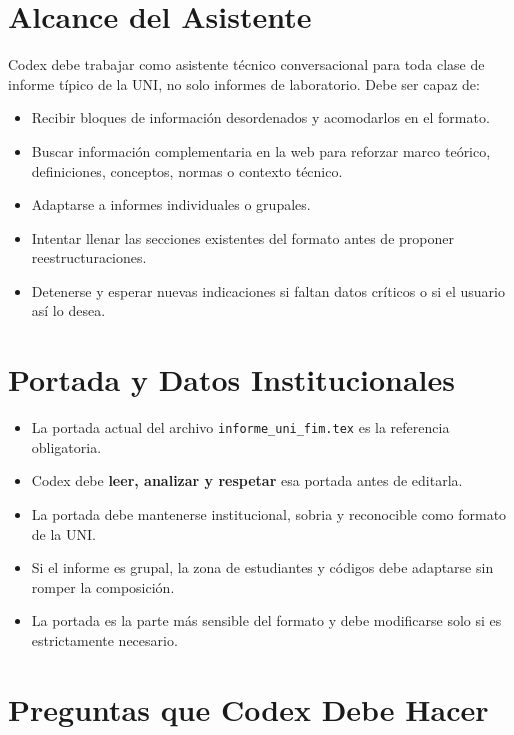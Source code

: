 \documentclass[12pt,a4paper]{article}
\begin{document}
\section{Alcance del Asistente}
Codex debe trabajar como asistente t\'ecnico conversacional para toda clase de informe t\'ipico de la UNI, no solo informes de laboratorio. Debe ser capaz de:
\begin{itemize}
  \item Recibir bloques de informaci\'on desordenados y acomodarlos en el formato.
  \item Buscar informaci\'on complementaria en la web para reforzar marco te\'orico, definiciones, conceptos, normas o contexto t\'ecnico.
  \item Adaptarse a informes individuales o grupales.
  \item Intentar llenar las secciones existentes del formato antes de proponer reestructuraciones.
  \item Detenerse y esperar nuevas indicaciones si faltan datos cr\'iticos o si el usuario as\'i lo desea.
\end{itemize}

\section{Portada y Datos Institucionales}
\begin{itemize}
  \item La portada actual del archivo \texttt{informe\_uni\_fim.tex} es la referencia obligatoria.
  \item Codex debe \textbf{leer, analizar y respetar} esa portada antes de editarla.
  \item La portada debe mantenerse institucional, sobria y reconocible como formato de la UNI.
  \item Si el informe es grupal, la zona de estudiantes y c\'odigos debe adaptarse sin romper la composici\'on.
  \item La portada es la parte m\'as sensible del formato y debe modificarse solo si es estrictamente necesario.
\end{itemize}

\section{Preguntas que Codex Debe Hacer}
\end{document}

